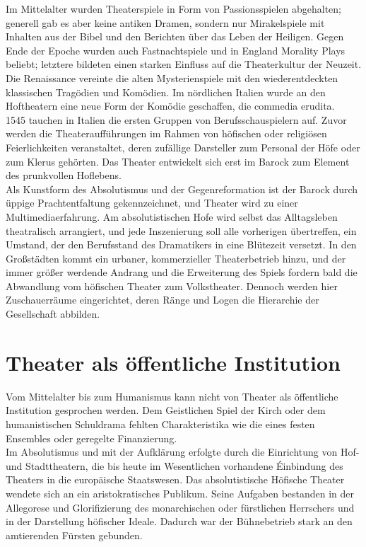 \documentclass[ngerman, a4paper, twoside]{scrbook}%
\begin{document}
	Im Mittelalter wurden Theaterspiele in Form von Passionsspielen abgehalten; generell gab es aber keine antiken Dramen, sondern nur Mirakelspiele mit Inhalten aus der Bibel und den Berichten über das Leben der Heiligen. Gegen Ende der Epoche wurden auch Fastnachtspiele und in England Morality Plays beliebt; letztere bildeten einen starken Einfluss auf die Theaterkultur der Neuzeit.\\

	Die Renaissance vereinte die alten Mysterienspiele mit den wiederentdeckten klassischen Tragödien und Komödien. Im nördlichen Italien wurde an den Hoftheatern eine neue Form der Komödie geschaffen, die commedia erudita.\\

	1545 tauchen in Italien die ersten Gruppen von Berufsschauspielern auf. Zuvor werden die Theateraufführungen im Rahmen von höfischen oder religiösen Feierlichkeiten veranstaltet, deren zufällige Darsteller zum Personal der Höfe oder zum Klerus gehörten. Das Theater entwickelt sich erst im Barock zum Element des prunkvollen Hoflebens.\\

	Als Kunstform des Absolutismus und der Gegenreformation ist der Barock durch üppige Prachtentfaltung gekennzeichnet, und Theater wird zu einer Multimediaerfahrung. Am absolutistischen Hofe wird selbst das Alltagsleben theatralisch arrangiert, und jede Inszenierung soll alle vorherigen übertreffen, ein Umstand, der den Berufsstand des Dramatikers in eine Blütezeit versetzt. In den Großstädten kommt ein urbaner, kommerzieller Theaterbetrieb hinzu, und der immer größer werdende Andrang und die Erweiterung des Spiels fordern bald die Abwandlung vom höfischen Theater zum Volkstheater. Dennoch werden hier Zuschauerräume eingerichtet, deren Ränge und Logen die Hierarchie der Gesellschaft abbilden.

	\section{Theater als öffentliche Institution}
	Vom Mittelalter bis zum Humanismus kann nicht von Theater als öffentliche Institution gesprochen werden. Dem Geistlichen Spiel der Kirch oder dem humanistischen Schuldrama fehlten Charakteristika wie die eines festen Ensembles oder geregelte Finanzierung.\\

	Im Absolutismus und mit der Aufklärung erfolgte durch die Einrichtung von Hof- und Stadttheatern, die bis heute im Wesentlichen vorhandene Éinbindung des Theaters in die europäische Staatswesen. Das absolutistische Höfische Theater wendete sich an ein aristokratisches Publikum. Seine Aufgaben bestanden in der Allegorese und Glorifizierung des monarchischen oder fürstlichen Herrschers und in der Darstellung höfischer Ideale. Dadurch war der Bühnebetrieb stark an den amtierenden Fürsten gebunden.\\
\end{document}

